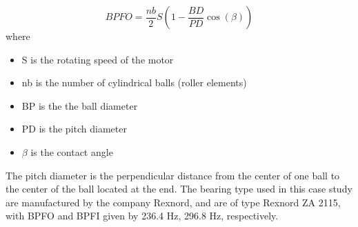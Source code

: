 \documentclass[../Main/thesis.tex]{subfiles}
\begin{document}
\begin{equation}\label{eq:bpfo}
BPFO = \frac{nb}{2}S\left( 1 -  \frac{BD}{PD}\cos(\beta)  \right)
\end{equation}
where 
\begin{itemize}
\item S is the rotating speed of the motor
\item nb is the number of cylindrical balls (roller elements)
\item BP is the the ball diameter
\item PD is the pitch diameter
\item $\beta$ is the contact angle
\end{itemize}
The pitch diameter is the perpendicular distance from the center of one ball to the center of the ball located at the end.
The bearing type used in this case study are manufactured by the company Rexnord, and are of type Rexnord ZA 2115, with BPFO and BPFI given by 236.4 Hz, 296.8 Hz, respectively. 
\end{document}
